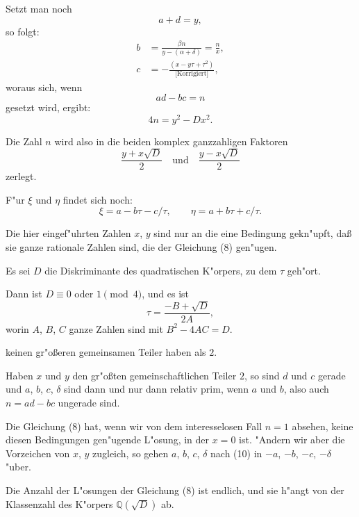\documentclass[11pt,a4paper]{article}
\theoremstyle{plain}
\begin{document}
\newpage
\setcounter{page}{415}

Setzt man noch
\begin{equation}
\label{eq:114_6}
a + d = y,
\end{equation}
so folgt:
\[
\begin{aligned}
b &= \frac{\beta n}{y - (\alpha + \delta)} = \frac{n}{x},\\
c &= -\frac{(x - y\tau + \tau^2)}{\text{[Korrigiert]}},
\end{aligned}
\]
woraus sich, wenn
\[
ad - bc = n
\]
gesetzt wird, ergibt:
\begin{equation}
\label{eq:114_8}
4n = y^2 - Dx^2.
\end{equation}

Die Zahl $n$ wird also in die beiden komplex ganzzahligen Faktoren
\[
\frac{y + x\sqrt{D}}{2} \quad \text{und} \quad \frac{y - x\sqrt{D}}{2}
\]
zerlegt.

F"{u}r $\xi$ und $\eta$ findet sich noch:
\[
\xi = a - b\tau - c/\tau, \qquad \eta = a + b\tau + c/\tau.
\]

Die hier eingef"{u}hrten Zahlen $x$, $y$ sind nur an die eine Bedingung gekn"{u}pft, da\ss{} sie ganze rationale Zahlen sind, die der Gleichung (8) gen"{u}gen.

\smallskip

Es sei $D$ die Diskriminante des quadratischen K"{o}rpers, zu dem $\tau$ geh"{o}rt.

Dann ist $D \equiv 0$ oder $1 \pmod{4}$, und es ist
\[
\tau = \frac{-B + \sqrt{D}}{2A},
\]
worin $A$, $B$, $C$ ganze Zahlen sind mit $B^2 - 4AC = D$.

\newpage
\setcounter{page}{416}

keinen gr"{o}\ss{}eren gemeinsamen Teiler haben als $2$.

Haben $x$ und $y$ den gr"{o}\ss{}ten gemeinschaftlichen Teiler $2$, so sind $d$ und $c$ gerade und $a$, $b$, $c$, $\delta$ sind dann und nur dann relativ prim, wenn $a$ und $b$, also auch $n = ad - bc$ ungerade sind.

Die Gleichung (8) hat, wenn wir von dem interesselosen Fall $n = 1$ absehen, keine diesen Bedingungen gen"{u}gende L"{o}sung, in der $x = 0$ ist. "{A}ndern wir aber die Vorzeichen von $x$, $y$ zugleich, so gehen $a$, $b$, $c$, $\delta$ nach (10) in $-a$, $-b$, $-c$, $-\delta$ "{u}ber.

\smallskip

Die Anzahl der L"{o}sungen der Gleichung (8) ist endlich, und sie h"{a}ngt von der Klassenzahl des K"{o}rpers $\mathbb{Q}(\sqrt{D})$ ab.
\end{document}
